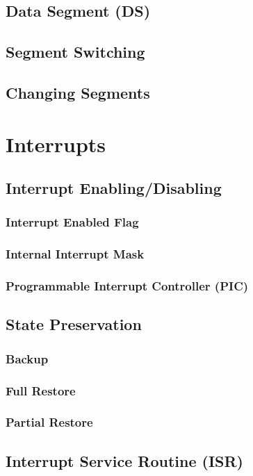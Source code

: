 \documentclass[oneside, a4paper]{memoir}
\begin{document}
\section{Data Segment (DS)}
\section{Segment Switching}
\section{Changing Segments}

\chapter{Interrupts}
\label{ch:Interrupts}
\section{Interrupt Enabling/Disabling}
\label{sec:Interrupt Enabling/Disabling}
\subsection{Interrupt Enabled Flag}
\subsection{Internal Interrupt Mask}
\subsection{Programmable Interrupt Controller (PIC)}
\section{State Preservation}
\label{sec:State Preservation}
\subsection{Backup}
\subsection{Full Restore}
\subsection{Partial Restore}
\section{Interrupt Service Routine (ISR)}
\end{document}
